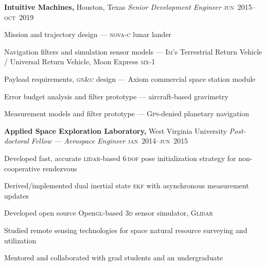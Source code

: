 \documentclass[12pt,letterpaper]{article}
\newenvironment{itemize*}%
{\begin{itemize}%
  \setlength{\itemsep}{0pt}}%
{\end{itemize}}
\newcommand{\mhead}[1]{\leavevmode\marginpar{\sffamily\footnotesize #1}}
\newcommand{\rdate}[1]{{\hfill #1}}
\begin{document}
\medskip
\textbf{Intuitive Machines,} Houston, Texas \newline
\emph{Senior Development Engineer} \rdate{\textsc{jun}~2015--\textsc{oct}~2019}
\begin{itemize*}
  \item Mission and trajectory design --- \textsc{nova-c} lunar lander
  \item Navigation filters and simulation sensor models --- \textsc{Im}'s Terrestrial Return Vehicle / Universal Return Vehicle, Moon Express \textsc{mx}-1
  \item Payload requirements, \textsc{gn\&c} design --- Axiom commercial space station module
  \item Error budget analysis and filter prototype --- aircraft-based gravimetry
  \item Measurement models and filter prototype --- \textsc{Gps}-denied planetary navigation
\end{itemize*}

\bigskip
\mhead{Academic \newline Appointments}%
\textbf{Applied Space Exploration Laboratory,} West Virginia University \newline
\emph{Post-doctoral Fellow --- Aerospace Engineer} \rdate{\textsc{jan}~2014--\textsc{jun}~2015}
\begin{itemize*}
  \item Developed fast, accurate \textsc{lidar}-based \textsc{6\,dof} pose initialization strategy for non-cooperative rendezvous
  \item Derived/implemented dual inertial state \textsc{ekf} with asynchronous measurement updates
  \item Developed open source Open\textsc{gl}-based \textsc{3d} sensor simulator, \textsc{Glidar}
  \item Studied remote sensing technologies for space natural resource surveying and utilization
  \item Mentored and collaborated with grad students and an undergraduate
\end{itemize*}
\end{document}
